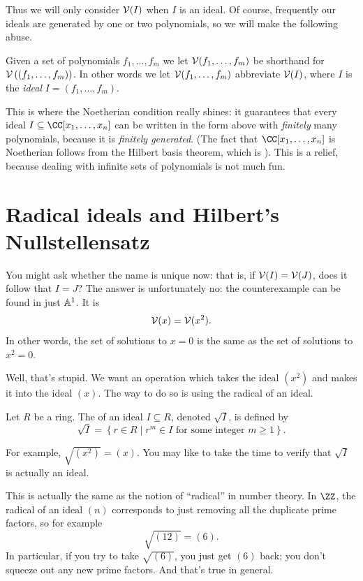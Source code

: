 \documentclass[11pt]{scrreprt}
\begin{document}
Thus we will only consider $\mathcal V(I)$ when $I$ is an ideal.
Of course, frequently our ideals are generated by one or two polynomials,
so we will make the following abuse.
\begin{abuse}
	Given a set of polynomials $f_1, \dots, f_m$
	we let $\mathcal V(f_1, \dots, f_m)$ be shorthand for
	$\mathcal V\left( \left( f_1, \dots, f_m \right) \right)$.
	In other words we let $\mathcal V(f_1, \dots, f_m)$
	abbreviate $\mathcal V(I)$, where $I$ is the \emph{ideal} $I=(f_1, \dots, f_m)$.
\end{abuse}

This is where the Noetherian condition really shines:
it guarantees that every ideal $I \subseteq \CC[x_1, \dots, x_n]$
can be written in the form above with \emph{finitely} many polynomials,
because it is \emph{finitely generated}.
(The fact that $\CC[x_1, \dots, x_n]$ is Noetherian follows from the Hilbert basis theorem,
which is ).
This is a relief, because dealing with infinite sets of polynomials is not much fun.

\section{Radical ideals and Hilbert's Nullstellensatz}
You might ask whether the name is unique now:
that is, if $\mathcal V(I) = \mathcal V(J)$, does it follow that $I=J$?
The answer is unfortunately no: the counterexample can be found in just $\mathbb A^1$.
It is
\[ \mathcal V(x) = \mathcal V(x^2). \]
In other words, the set of solutions to $x=0$ is the same as the set of solutions to $x^2=0$.

Well, that's stupid.
We want an operation which takes the ideal $(x^2)$ and makes it into the ideal $(x)$.
The way to do so is using the radical of an ideal.

\begin{definition}
	Let $R$ be a ring.
	The  of an ideal $I \subseteq R$, denoted $\sqrt I$,
	is defined by
	\[
		\sqrt I =
		\left\{ r \in R
			\mid r^m \in I \text{ for some integer $m \ge 1$}  \right\}. 
	\]
\end{definition}
For example, $\sqrt{(x^2)} = (x)$.
You may like to take the time to verify that $\sqrt I$ is actually an ideal.

This is actually the same as the notion of ``radical'' in number theory.
In $\ZZ$, the radical of an ideal $(n)$ corresponds to just
removing all the duplicate prime factors, so for example
\[ \sqrt{(12)} = (6). \]
In particular, if you try to take $\sqrt{(6)}$, you just get $(6)$ back;
you don't squeeze out any new prime factors.
And that's true in general.
\end{document}
